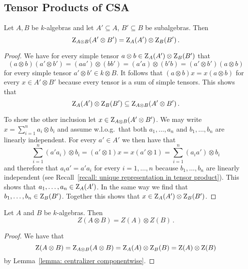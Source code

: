 \subsection{Tensor Products of CSA}


\begin{lemma}
  \label{lemma: centralizer componentwise}
  Let $A, B$ be $k$-algebras and let $A' \subseteq A$, $B' \subseteq B$ be subalgebras.
  Then
  \[
      \operatorname{Z}_{A \otimes B}(A' \otimes B')
    = \operatorname{Z}_A(A') \otimes \operatorname{Z}_B(B') \,.
  \]
\end{lemma}


\begin{proof}
  We have for every simple tensor $a \otimes b \in \operatorname{Z}_A(A') \otimes \operatorname{Z}_B(B')$ that
  \[
      (a \otimes b) (a' \otimes b')
    = (aa') \otimes (bb')
    = (a'a) \otimes (b'b)
    = (a' \otimes b')(a \otimes b)
  \]
  for every simple tensor $a' \otimes b' \in k \otimes B$.
  It follows that $(a \otimes b) x = x (a \otimes b)$ for every $x \in A' \otimes B'$ because every tensor is a sum of simple tensors.
  This shows that
  \[
              \operatorname{Z}_A(A') \otimes \operatorname{Z}_B(B')
    \subseteq \operatorname{Z}_{A \otimes B}(A' \otimes B') \,.
  \]
  
  To show the other inclusion let $x \in \operatorname{Z}_{A \otimes B}(A' \otimes B')$.
  We may write $x = \sum_{i=1}^n a_i \otimes b_i$ and assume w.l.o.g.\ that both $a_1, \dotsc, a_n$ and $b_1, \dotsc, b_n$ are linearly independent.
  For every $a' \in A'$ we then have that
  \[
      \sum_{i=1}^n (a' a_i) \otimes b_i
    = (a' \otimes 1) x
    = x (a' \otimes 1)
    = \sum_{i=1}^n (a_i a') \otimes b_i
  \]
  and therefore that $a_i a' = a' a_i$ for every $i = 1, \dotsc, n$ because $b_1, \dotsc, b_n$ are linearly independent (see Recall~\ref{recall: unique representation in tensor product}).
  This shows that $a_1, \dotsc, a_n \in \operatorname{Z}_{A}(A')$.
  In the same way we find that $b_1, \dotsc, b_n \in \operatorname{Z}_{B}(B')$.
  Together this shows that $x \in \operatorname{Z}_A(A') \otimes \operatorname{Z}_B(B')$.
\end{proof}


\begin{corollary}
  \label{corollary: center of tensor product}
  Let $A$ and $B$ be $k$-algebras.
  Then
  \[
      Z(A \otimes B)
    = Z(A) \otimes Z(B) \,.
  \]
\end{corollary}


\begin{proof}
  We have that
  \[
      \operatorname{Z}(A \otimes B)
    = \operatorname{Z}_{A \otimes B}(A \otimes B)
    = \operatorname{Z}_A(A) \otimes \operatorname{Z}_B(B)
    = \operatorname{Z}(A) \otimes \operatorname{Z}(B)
  \]
  by Lemma~\ref{lemma: centralizer componentwise}.
\end{proof}


